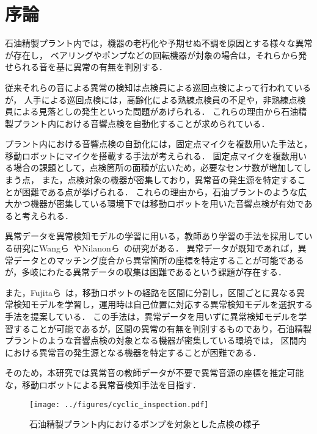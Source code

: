 \documentclass[../main]{subfiles}
\begin{document}
\graphicspath{{../figures/}}




\section{序論}



石油精製プラント内では，機器の老朽化や予期せぬ不調を原因とする様々な異常が存在し，
ベアリングやポンプなどの回転機器が対象の場合は，それらから発せられる音を基に異常の有無を判別する．




従来それらの音による異常の検知は点検員による巡回点検によって行われているが，
人手による巡回点検には，高齢化による熟練点検員の不足や，非熟練点検員による見落としの発生といった問題があげられる．
これらの理由から石油精製プラント内における音響点検を自動化することが求められている．


プラント内における音響点検の自動化には，固定点マイクを複数用いた手法と，移動ロボットにマイクを搭載する手法が考えられる．
固定点マイクを複数用いる場合の課題として，点検箇所の面積が広いため，必要なセンサ数が増加してしまう点，
また，点検対象の機器が密集しており，異常音の発生源を特定することが困難である点が挙げられる．
これらの理由から，石油プラントのような広大かつ機器が密集している環境下では移動ロボットを用いた音響点検が有効であると考えられる．

異常データを異常検知モデルの学習に用いる，教師あり学習の手法を採用している研究にWangら~\cite{wang2022}やNilanonら~\cite{Nilanon2016}の研究がある．
異常データが既知であれば，異常データとのマッチング度合から異常箇所の座標を特定することが可能であるが，多岐にわたる異常データの収集は困難であるという課題が存在する．


また，Fujitaら~\cite{fujita2023}は，移動ロボットの経路を区間に分割し，区間ごとに異なる異常検知モデルを学習し，運用時は自己位置に対応する異常検知モデルを選択する手法を提案している．
この手法は，異常データを用いずに異常検知モデルを学習することが可能であるが，区間の異常の有無を判別するものであり，石油精製プラントのような音響点検の対象となる機器が密集している環境では，
区間内における異常音の発生源となる機器を特定することが困難である．

そのため，本研究では異常音の教師データが不要で異常音源の座標を推定可能な，移動ロボットによる異常音検知手法を目指す．

\begin{figure}[tb]
  \centering
  \texttt{[image: ../figures/cyclic\_inspection.pdf]}
  \caption{石油精製プラント内におけるポンプを対象とした点検の様子}
  \label{fig:cyclic_inspection}
\end{figure}
\end{document}
